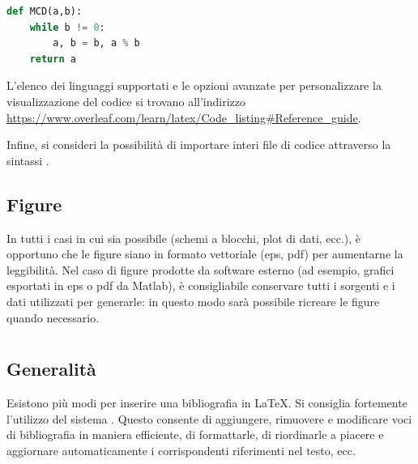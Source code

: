\documentclass[12pt]{report}
\begin{document}
\begin{lstlisting}[language=Python]
def MCD(a,b):
	while b != 0:
		a, b = b, a % b
	return a
\end{lstlisting}

L'elenco dei linguaggi supportati e le opzioni avanzate per personalizzare la visualizzazione del codice si trovano all'indirizzo \url{https://www.overleaf.com/learn/latex/Code_listing#Reference_guide}.

Infine, si consideri la possibilità di importare interi file di codice attraverso la sintassi \verb||.

\subsection{Figure}

In tutti i casi in cui sia possibile (schemi a blocchi, plot di dati, ecc.), \`e opportuno che le figure siano in formato vettoriale (eps, pdf) per aumentarne la leggibilit\`a.
Nel caso di figure prodotte da software esterno (ad esempio, grafici esportati in eps o pdf da Matlab), \`e consigliabile conservare tutti i sorgenti e i dati utilizzati per generarle: in questo modo sarà possibile ricreare le figure quando necessario.




\section{}
\label{sec:bibtex}

\subsection{Generalit\`a}

Esistono più modi per inserire una bibliografia in \LaTeX. Si consiglia fortemente l'utilizzo del sistema . Questo consente di aggiungere, rimuovere e modificare voci di bibliografia in maniera efficiente, di formattarle, di riordinarle a piacere e aggiornare automaticamente i corrispondenti riferimenti nel testo, ecc.
\end{document}
